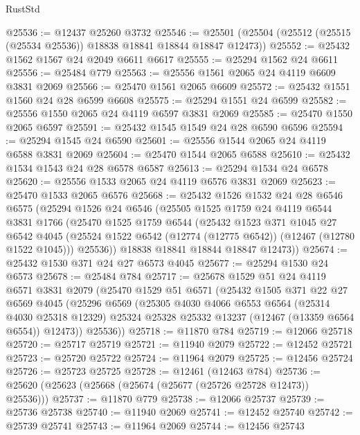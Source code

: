 \begin{lexlean}{RustStd}
\begin{coremodule}
@25536 := @12437 @25260 @3732
@25546 := @25501 (@25504 (@25512 (@25515 (@25534 @25536)) @18838 @18841 @18844 @18847 @12473))
@25552 := @25432 @1562 @1567 @24 @2049 @6611 @6617
@25555 := @25294 @1562 @24 @6611
@25556 := @25484 @779
@25563 := @25556 @1561 @2065 @24 @4119 @6609 @3831 @2069
@25566 := @25470 @1561 @2065 @6609
@25572 := @25432 @1551 @1560 @24 @28 @6599 @6608
@25575 := @25294 @1551 @24 @6599
@25582 := @25556 @1550 @2065 @24 @4119 @6597 @3831 @2069
@25585 := @25470 @1550 @2065 @6597
@25591 := @25432 @1545 @1549 @24 @28 @6590 @6596
@25594 := @25294 @1545 @24 @6590
@25601 := @25556 @1544 @2065 @24 @4119 @6588 @3831 @2069
@25604 := @25470 @1544 @2065 @6588
@25610 := @25432 @1534 @1543 @24 @28 @6578 @6587
@25613 := @25294 @1534 @24 @6578
@25620 := @25556 @1533 @2065 @24 @4119 @6576 @3831 @2069
@25623 := @25470 @1533 @2065 @6576
@25668 := @25432
    @1526
    @1532
    @24
    @28
    @6546
    @6575
    (@25294
      @1526
      @24
      @6546
      (@25505
        @1525
        @1759
        @24
        @4119
        @6544
        @3831
        @1766
        (@25470
          @1525
          @1759
          @6544
          (@25432
            @1523
            @371
            @1045
            @27
            @6542
            @4045
            (@25524 @1522 @6542 (@12774 (@12775 @6542)) (@12467 (@12780 @1522 @1045)))
            @25536))
        @18838
        @18841
        @18844
        @18847
        @12473))
@25674 := @25432 @1530 @371 @24 @27 @6573 @4045
@25677 := @25294 @1530 @24 @6573
@25678 := @25484 @784
@25717 := @25678
    @1529
    @51
    @24
    @4119
    @6571
    @3831
    @2079
    (@25470
      @1529
      @51
      @6571
      (@25432
        @1505
        @371
        @22
        @27
        @6569
        @4045
        (@25296
          @6569
          (@25305
            @4030
            @4066
            @6553
            @6564
            (@25314 @4030 @25318 @12329)
            @25324
            @25328
            @25332
            @13237
            (@12467 (@13359 @6564 @6554))
            @12473))
        @25536))
@25718 := @11870 @784
@25719 := @12066 @25718
@25720 := @25717 @25719
@25721 := @11940 @2079
@25722 := @12452 @25721
@25723 := @25720 @25722
@25724 := @11964 @2079
@25725 := @12456 @25724
@25726 := @25723 @25725
@25728 := @12461 (@12463 @784)
@25736 := @25620 (@25623 (@25668 (@25674 (@25677 (@25726 @25728 @12473)) @25536)))
@25737 := @11870 @779
@25738 := @12066 @25737
@25739 := @25736 @25738
@25740 := @11940 @2069
@25741 := @12452 @25740
@25742 := @25739 @25741
@25743 := @11964 @2069
@25744 := @12456 @25743

\end{coremodule}
\end{lexlean}
